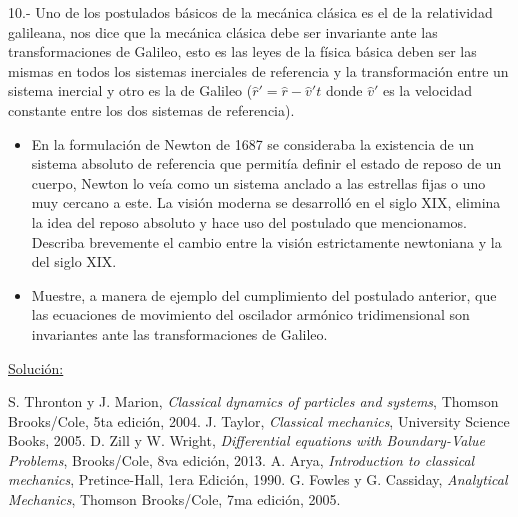 \documentclass[a4paper,10pt]{article}
\numberwithin{equation}{section}
\begin{document}
\vspace{.3cm}

10.- Uno de los postulados básicos de la mecánica clásica es el de la relatividad galileana,
nos dice que la mecánica clásica debe ser invariante ante las transformaciones de Galileo, 
esto es las leyes de la física básica deben ser las mismas en todos los sistemas inerciales
de referencia y la transformación entre un sistema inercial y otro es la de Galileo 
($\hat{r}' = \hat{r} - \hat{v}'t$ donde $\hat{v}'$ es la velocidad constante entre los dos 
sistemas de referencia).

\begin{itemize}
 \item En la formulación de Newton de 1687 se consideraba la existencia de un sistema 
 absoluto de referencia que permitía definir el estado de reposo de un cuerpo, Newton lo
 veía como un sistema anclado a las estrellas fijas o uno muy cercano a este. La visión 
 moderna se desarrolló en el siglo XIX, elimina la idea del reposo absoluto y hace 
 uso del postulado que mencionamos. Describa brevemente el cambio entre la visión 
 estrictamente newtoniana y la del siglo XIX.
 \item Muestre, a manera de ejemplo del cumplimiento del postulado anterior, que las 
 ecuaciones de movimiento del oscilador armónico tridimensional son invariantes ante
 las transformaciones de Galileo.
\end{itemize}

\vspace{.3cm}

\underline{Solución:}

\vspace{.3cm}

\begin{thebibliography}{10}
 S. Thronton y J. Marion, \textit{Classical dynamics of particles and systems}, Thomson Brooks/Cole,
 5ta edición, 2004.
 J. Taylor, \textit{Classical mechanics}, University Science Books, 2005.
 D. Zill y W. Wright, \textit{Differential equations with Boundary-Value Problems}, Brooks/Cole,
 8va edición, 2013.
 A. Arya, \textit{Introduction to classical mechanics}, Pretince-Hall, 1era Edición,
 1990.
 G. Fowles y G. Cassiday, \emph{Analytical Mechanics}, Thomson Brooks/Cole, 
 7ma edición, 2005.
\end{thebibliography}
\end{document}
